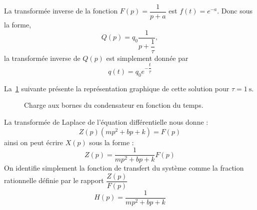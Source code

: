 La transformée inverse de la fonction $F(p)=\dfrac{1}{p+a}$ est $f(t)=e^{-a}$.
Donc sous la forme,
\[
    Q(p)=q_0\dfrac{1}{p+\dfrac{1}{\tau}},
\]
la transformée inverse de $Q(p)$ est simplement donnée par 
\[
    q(t)=q_0e^{-\dfrac{t}{\tau}}
\]
\begin{center}
    
\end{center}
La~\cref{fig-decharge} suivante présente la représentation graphique de 
cette solution pour $\tau=\SI{1}{\second}$.
\begin{figure}[!h]
    \centering
    
    \caption{Charge aux bornes du condensateur en fonction du temps.
    \label{fig-decharge}}
\end{figure}
\clearpage
La transformée de Laplace de l'équation différentielle nous donne : 
\[
    Z(p)\left(mp^2+bp+k\right)=F(p)
\]
ainsi on peut écrire $X(p)$ sous la forme :
\[
    Z(p)=\dfrac{1}{mp^2+bp+k}F(p)
\]
On identifie simplement la fonction de transfert du système comme la fraction 
rationnelle définie par le rapport $\dfrac{Z(p)}{F(p)}$
\[
    H(p)=\dfrac{1}{mp^2+bp+k}
\]

